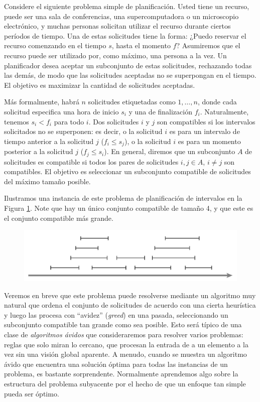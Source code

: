 \documentclass[a4paper, 12pt]{book}
\theoremstyle{dotless}
\begin{document}
Considere el siguiente problema simple de planificación. Usted tiene un recurso, puede ser una sala de conferencias, una supercomputadora o un microscopio electrónico, y muchas personas solicitan utilizar el recurso durante ciertos períodos de tiempo. Una de estas solicitudes tiene la forma: ¿Puedo reservar el recurso comenzando en el tiempo $s$, hasta el momento $f$? Asumiremos que el recurso puede ser utilizado por, como máximo, una persona a la vez. Un planificador desea aceptar un subconjunto de estas solicitudes, rechazando todas las demás, de modo que las solicitudes aceptadas no se superpongan en el tiempo. El objetivo es maximizar la cantidad de solicitudes aceptadas.

Más formalmente, habrá $n$ solicitudes etiquetadas como $1,\dots, n$, donde cada solicitud especifica una hora de inicio $s_i$ y una de finalización $f_i$. Naturalmente, tenemos $s_i < f_i$ para todo $i$. Dos solicitudes $i$ y $j$ son compatibles si los intervalos solicitados no se superponen: es decir, o la solicitud $i$ es para un intervalo de tiempo anterior a la solicitud $j$ ($f_i \leq s_j$), o la solicitud $i$ es para un momento posterior a la solicitud $j$ ($f_j \leq s_i$). En general, diremos que un subconjunto $A$ de solicitudes es compatible si todos los pares de solicitudes $i,j \in A$, $i \neq j$ son compatibles. El objetivo es seleccionar un subconjunto compatible de solicitudes del máximo tamaño posible.

Ilustramos una instancia de este problema de planificación de intervalos en la Figura \ref{fig:fig1-4}. Note que hay un único conjunto compatible de tamaño 4, y que este es el conjunto compatible más grande.

\begin{figure}[h]
    \centering
    \includegraphics[width=.8\textwidth]{Imagenes-Seccion1/fig1-4.PNG}
\label{fig:fig1-4}
\end{figure}

Veremos en breve que este problema puede resolverse mediante un algoritmo muy natural que ordena el conjunto de solicitudes de acuerdo con una cierta heurística y luego las procesa con ``avidez'' (\textit{greed}) en una pasada, seleccionando un subconjunto compatible tan grande como sea posible. Esto será típico de una clase de \textit{algoritmos ávidos} que consideraremos para resolver varios problemas: reglas que solo miran lo cercano, que procesan la entrada de a un elemento a la vez sin una visión global aparente. A menudo, cuando se muestra un algoritmo ávido que encuentra una solución óptima para todas las instancias de un problema, es bastante sorprendente. Normalmente aprendemos algo sobre la estructura del problema subyacente por el hecho de que un enfoque tan simple pueda ser óptimo.
\end{document}
